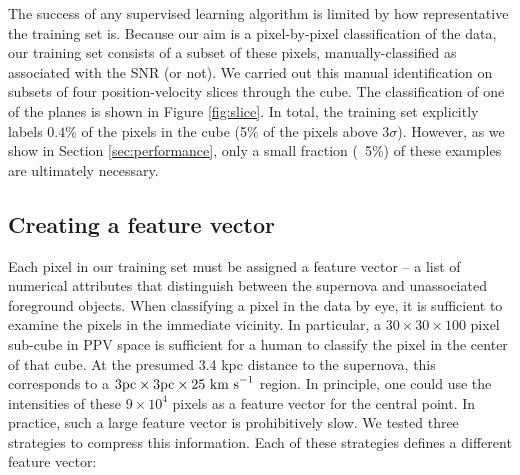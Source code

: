 The success of any supervised learning algorithm is limited by how representative the training set is. Because our aim is a pixel-by-pixel classification of the data, our training set consists of a subset of these pixels, manually-classified as associated with the SNR (or not). We carried out this manual identification on subsets of four position-velocity slices through the cube. The classification of one of the planes is shown in Figure \ref{fig:slice}. In total, the training set explicitly labels $0.4\%$ of the pixels in the cube (5\% of the pixels above $3 \sigma$). However, as we show in Section \ref{sec:performance}, only a small fraction (~5\%) of these examples are ultimately necessary.

\subsection{Creating a feature vector}
\label{sec:feature}
Each pixel in our training set must be assigned a feature vector -- a list of numerical attributes that distinguish between the supernova and unassociated foreground objects. When classifying a pixel in the data by eye, it is sufficient to examine the pixels in the immediate vicinity. In particular, a $30\times30\times100$ pixel sub-cube  in PPV space is sufficient for a human to classify the pixel in the center of that cube. At the presumed 3.4 kpc distance to the supernova, this corresponds to a $3 {\rm pc} \times 3 {\rm pc} \times 25 {\rm ~km ~s}^{-1}$ region. In principle, one could use the intensities of these $9 \times 10^4$ pixels as a feature vector for the central point. In practice, such a large feature vector is prohibitively slow. We tested three strategies to compress this information. Each of these strategies defines a different feature vector:

